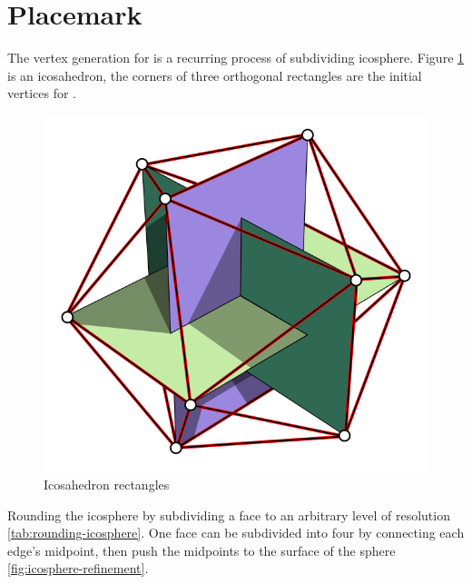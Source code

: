 \section{Placemark}

The vertex generation for  is a recurring process of subdividing icosphere. Figure \ref{fig:icosahedron-rectangles} is an icosahedron, the corners of three orthogonal rectangles are the initial vertices for .

\begin{figure}[H]
\caption[Icosahedron rectangles]{Icosahedron rectangles \cite{wiki.icosahedron-rectangles.2006}}
\label{fig:icosahedron-rectangles}
\centering
\includegraphics[width=\linewidth]{Figures/icosahedron-rectangles.png}
\decoRule
\end{figure}

Rounding the icosphere by subdividing a face to an arbitrary level of resolution \ref{tab:rounding-icosphere}. One face can be subdivided into four by connecting each edge's midpoint, then push the midpoints to the surface of the sphere \ref{fig:icosphere-refinement}.

